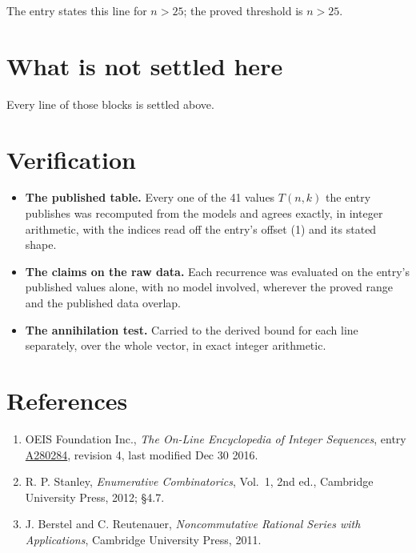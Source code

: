 \documentclass[11pt]{article}
\theoremstyle{definition}
\begin{document}
The entry states this line for $n > 25$; the proved threshold is $n > 25$.

\section{What is not settled here}

Every line of those blocks is settled above.

\section{Verification}

\begin{itemize}

\item {\bfseries The published table.} Every one of the 41 values $T(n,k)$ the entry publishes was recomputed from the models and agrees exactly, in integer arithmetic, with the indices read off the entry's offset (1) and its stated shape.

\item {\bfseries The claims on the raw data.} Each recurrence was evaluated on the entry's published values alone, with no model involved, wherever the proved range and the published data overlap.

\item {\bfseries The annihilation test.} Carried to the derived bound for each line separately, over the whole vector, in exact integer arithmetic.

\end{itemize}

\section{References}

\begin{enumerate}

\item OEIS Foundation Inc., \emph{The On-Line Encyclopedia of Integer Sequences}, entry \href{https://oeis.org/A280284}{A280284}, revision 4, last modified Dec 30 2016.

\item R. P. Stanley, \emph{Enumerative Combinatorics}, Vol.~1, 2nd ed., Cambridge University Press, 2012; \S4.7.

\item J. Berstel and C. Reutenauer, \emph{Noncommutative Rational Series with Applications}, Cambridge University Press, 2011.

\end{enumerate}
\end{document}
